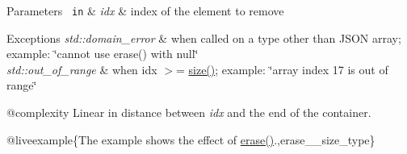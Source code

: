 \begin{DoxyParams}[1]{Parameters}
\mbox{\texttt{ in}}  & {\em idx} & index of the element to remove\\
\hline
\end{DoxyParams}

\begin{DoxyExceptions}{Exceptions}
{\em std\+::domain\+\_\+error} & when called on a type other than J\+S\+ON array; example\+: {\ttfamily \char`\"{}cannot use erase() with null\char`\"{}} \\
\hline
{\em std\+::out\+\_\+of\+\_\+range} & when {\ttfamily idx $>$= \mbox{\hyperlink{classnlohmann_1_1basic__json_a25e27ad0c6d53c01871c5485e1f75b96}{size()}}}; example\+: {\ttfamily \char`\"{}array index 17
is out of range\char`\"{}}\\
\hline
\end{DoxyExceptions}
@complexity Linear in distance between {\itshape idx} and the end of the container.

@liveexample\{The example shows the effect of {\ttfamily \mbox{\hyperlink{classnlohmann_1_1basic__json_a068a16e76be178e83da6a192916923ed}{erase()}}}.,erase\+\_\+\+\_\+size\+\_\+type\}

